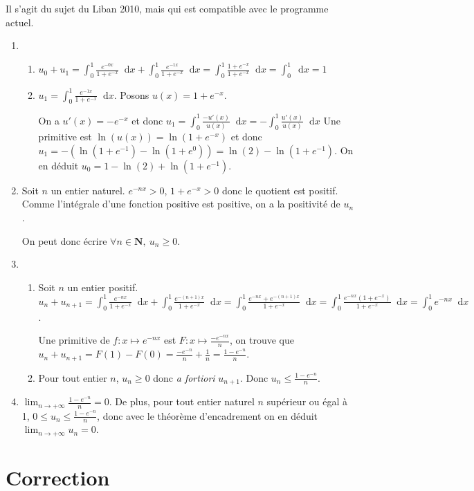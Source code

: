 \documentclass[12pt,a4paper,french]{article}
\newcommand{\N}{\mathbf{N}}
\newcommand{\diff}{\mathop{}\mathopen{}\mathrm{d}}
\theoremstyle{break}
\theoremstyle{plain}
\theoremstyle{nonumberplain}
\theoremstyle{nonumberbreak}
\begin{document}
\begin{solution}
  Il s'agit du sujet du Liban 2010, mais qui est compatible avec le
  programme actuel.

  \begin{enumerate}
    \item \begin{enumerate}
        \item $u_0 + u_1 = \int_0^1 \frac{e^{-0x}}{1 + e^{-x}}\diff x +
          \int_0^1 \frac{e^{-1x}}{1 + e^{-x}}\diff x = \int_0^1 \frac{1
          + e^{-x}}{1 + e^{-x}}\diff x = \int_0^1 \diff x = 1$
        \item $u_1 = \int_0^1 \frac{e^{-1x}}{1 + e^{-x}}\diff x$. Posons
          $u(x) = 1 + e^{-x}$.

          On a $u'(x) = -e^{-x}$ et donc $u_1 = \int_0^1
          \frac{-u'(x)}{u(x)}\diff x = - \int_0^1
          \frac{u'(x)}{u(x)}\diff x$ Une primitive est $\ln(u(x)) =
          \ln(1+e^{-x})$ et donc $u_1 = -(\ln(1+e^{-1}) - \ln(1+e^{0}))
          = \ln(2) - \ln(1+e^{-1})$. On en déduit $u_0 = 1 - \ln(2) +
          \ln(1+e^{-1})$.
      \end{enumerate}
    \item Soit $n$ un entier naturel. $e^{-nx} > 0$, $1+e^{-x} > 0$ donc
      le quotient est positif. Comme l'intégrale d'une fonction positive
      est positive, on a la positivité de $u_n$.

      On peut donc écrire $\forall n \in\N,\ u_n \geqslant 0$.
    \item \begin{enumerate}
        \item Soit $n$ un entier positif. $u_n + u_{n+1} = \int_0^1
          \frac{e^{-nx}}{1 + e^{-x}}\diff x + \int_0^1
          \frac{e^{-(n+1)x}}{1 + e^{-x}}\diff x = \int_0^1 \frac{
          e^{-nx} + e^{-(n+1)x}}{1 + e^{-x}}\diff x = \int_0^1 \frac{
          e^{-nx} (1 + e^{-x})}{1 + e^{-x}}\diff x = \int_0^1 e^{-nx}
          \diff x$.

          Une primitive de $f\colon x\mapsto e^{-nx}$ est $F\colon
          x\mapsto \frac{-e^{-nx}}n$, on trouve que $u_n + u_{n+1} =
          F(1) - F(0) = \frac{-e^{-n}}n + \frac1n = \frac{1 - e^{-n}}n$.
        \item Pour tout entier $n$, $u_n \geqslant 0$ donc \emph{a
          fortiori} $u_{n+1}$. Donc $u_n \leqslant \frac{1 - e^{-n}}{n}$.
      \end{enumerate}
    \item $\lim_{n\to+\infty} \frac{1 - e^{-n}}n = 0$. De plus, pour
      tout entier naturel $n$ supérieur ou égal à 1, $0 \leqslant u_n
      \leqslant \frac{1 - e^{-n}}n$, donc avec le théorème d'encadrement
      on en déduit $\lim_{n\to+\infty} u_n = 0$.
  \end{enumerate}

\end{solution}


\newpage
\section*{Correction}
\printsolutions
\end{document}
